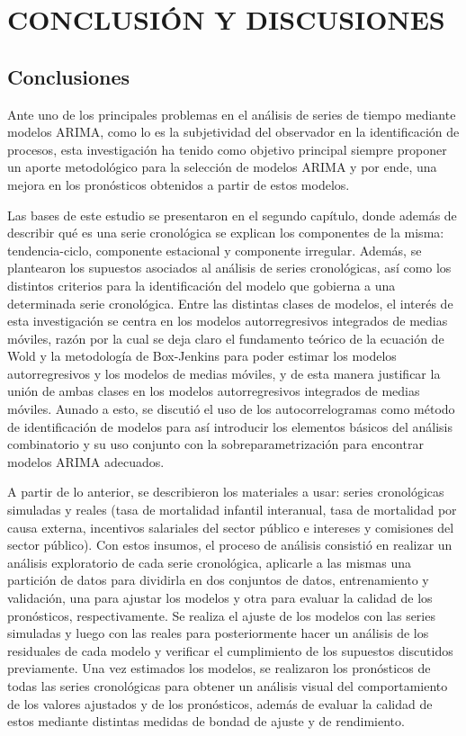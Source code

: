 \documentclass[
]{article}
\begin{document}
\newpage
\newpage

\section{CONCLUSIÓN Y DISCUSIONES}


\label{chap:conclusiones}
\subsection{Conclusiones}

Ante uno de los principales problemas en el análisis de series de tiempo
mediante modelos ARIMA, como lo es la subjetividad del observador en la
identificación de procesos, esta investigación ha tenido como objetivo
principal siempre proponer un aporte metodológico para la selección de
modelos ARIMA y por ende, una mejora en los pronósticos obtenidos a
partir de estos modelos.

Las bases de este estudio se presentaron en el segundo capítulo, donde
además de describir qué es una serie cronológica se explican los
componentes de la misma: tendencia-ciclo, componente estacional y
componente irregular. Además, se plantearon los supuestos asociados al
análisis de series cronológicas, así como los distintos criterios para
la identificación del modelo que gobierna a una determinada serie
cronológica. Entre las distintas clases de modelos, el interés de esta
investigación se centra en los modelos autorregresivos integrados de
medias móviles, razón por la cual se deja claro el fundamento teórico de
la ecuación de Wold y la metodología de Box-Jenkins para poder estimar
los modelos autorregresivos y los modelos de medias móviles, y de esta
manera justificar la unión de ambas clases en los modelos
autorregresivos integrados de medias móviles. Aunado a esto, se discutió
el uso de los autocorrelogramas como método de identificación de modelos
para así introducir los elementos básicos del análisis combinatorio y su
uso conjunto con la sobreparametrización para encontrar modelos ARIMA
adecuados.

A partir de lo anterior, se describieron los materiales a usar: series
cronológicas simuladas y reales (tasa de mortalidad infantil interanual,
tasa de mortalidad por causa externa, incentivos salariales del sector
público e intereses y comisiones del sector público). Con estos insumos,
el proceso de análisis consistió en realizar un análisis exploratorio de
cada serie cronológica, aplicarle a las mismas una partición de datos
para dividirla en dos conjuntos de datos, entrenamiento y validación,
una para ajustar los modelos y otra para evaluar la calidad de los
pronósticos, respectivamente. Se realiza el ajuste de los modelos con
las series simuladas y luego con las reales para posteriormente hacer un
análisis de los residuales de cada modelo y verificar el cumplimiento de
los supuestos discutidos previamente. Una vez estimados los modelos, se
realizaron los pronósticos de todas las series cronológicas para obtener
un análisis visual del comportamiento de los valores ajustados y de los
pronósticos, además de evaluar la calidad de estos mediante distintas
medidas de bondad de ajuste y de rendimiento.
\end{document}
